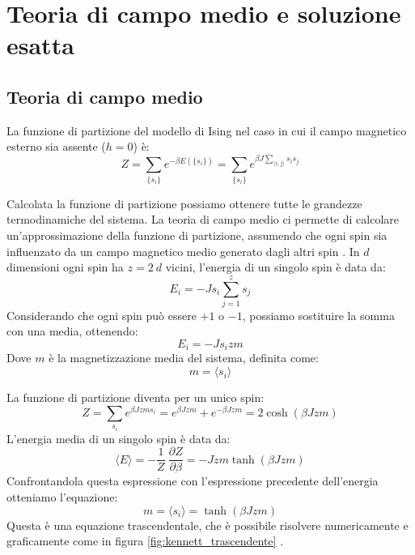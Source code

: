 \section{Teoria di campo medio e soluzione esatta}

\subsection{Teoria di campo medio}
La funzione di partizione del modello di Ising nel caso in cui il campo magnetico esterno sia assente ($h=0$) è:
\begin{equation}
Z = \sum_{\{s_i\}} e^{-\beta E(\{s_i\})} = \sum_{\{s_i\}} e^{\beta J \sum_{\langle i,j \rangle} s_i s_j}
\end{equation}

Calcolata la funzione di partizione possiamo ottenere tutte le grandezze termodinamiche del sistema. La teoria di campo medio ci permette 
di calcolare un'approssimazione della funzione di partizione, assumendo che ogni spin sia influenzato 
da un campo magnetico medio generato dagli altri spin \cite{stanford_sml_susskind}.
In $d$ dimensioni ogni spin ha $z = 2 \ d $ vicini, l'energia di un singolo spin è data da:
\begin{equation}
E_i = -J s_i \sum_{j=1}^z s_j
\end{equation}
Considerando che ogni spin può essere $+1$ o $-1$, possiamo sostituire la somma con una media, ottenendo:
\begin{equation}
E_i = -J s_i z m
\end{equation}
Dove $m$ è la magnetizzazione media del sistema, definita come:
\begin{equation}
m = \langle s_i \rangle 
\end{equation}

La funzione di partizione diventa per un unico spin:
\begin{equation}
    Z = \sum_{s_i} e^{\beta J z m s_i} = e^{\beta J z m} + e^{-\beta J z m} = 2 \cosh(\beta J z m)
\end{equation}
L'energia media di un singolo spin è data da:
\begin{equation}
    \langle E \rangle= - \frac{1}{Z} \ \frac{\partial Z}{\partial \beta} = - J z m \tanh(\beta J z m)
\end{equation}
Confrontandola questa espressione con l'espressione precedente dell'energia otteniamo l'equazione:
\begin{equation}
    m = \langle s_i \rangle = \tanh(\beta J z m)
\end{equation}
Questa è una equazione trascendentale, che è possibile risolvere numericamente\cite{essential_statistical_physics} 
e graficamente come in figura \ref{fig:kennett_trascendente} .

